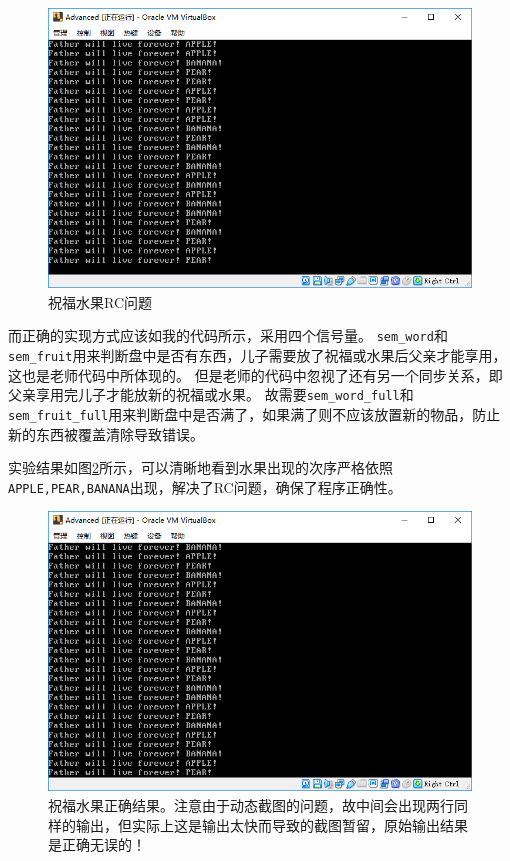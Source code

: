 \documentclass[logo,reportComp]{thesis}
\begin{document}
\begin{figure}[H]
\centering
\includegraphics[width=0.8\linewidth]{fig/fruit-wrong.PNG}
\caption{祝福水果RC问题}
\label{fig:fruit-wrong}
\end{figure}

而正确的实现方式应该如我的代码所示，采用四个信号量。
\verb'sem_word'和\verb'sem_fruit'用来判断盘中是否有东西，儿子需要放了祝福或水果后父亲才能享用，这也是老师代码中所体现的。
但是老师的代码中忽视了还有另一个同步关系，即父亲享用完儿子才能放新的祝福或水果。
故需要\verb'sem_word_full'和\verb'sem_fruit_full'用来判断盘中是否满了，如果满了则不应该放置新的物品，防止新的东西被覆盖清除导致错误。

实验结果如图\ref{fig:fruit}所示，可以清晰地看到水果出现的次序严格依照\verb'APPLE,PEAR,BANANA'出现，解决了RC问题，确保了程序正确性。
\begin{figure}[H]
\centering
\includegraphics[width=0.8\linewidth]{fig/fruit.PNG}
\caption{祝福水果正确结果。注意由于动态截图的问题，故中间会出现两行同样的输出，但实际上这是输出太快而导致的截图暂留，原始输出结果是正确无误的！}
\label{fig:fruit}
\end{figure}
\end{document}
